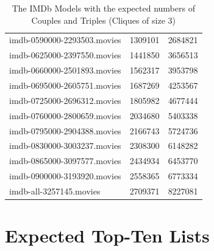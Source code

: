 \documentclass[a4paper,11pt]{article}
\begin{document}
\begin{table}[h!]
\begin{tabular}{| l | r | r |}
    imdb-0590000-2293503.movies & 1309101            & 2684821\\
    imdb-0625000-2397550.movies & 1441850            & 3656513\\
    imdb-0660000-2501893.movies & 1562317            & 3953798\\
    imdb-0695000-2605751.movies & 1687269            & 4253567\\
    imdb-0725000-2696312.movies & 1805982            & 4677444\\
    imdb-0760000-2800659.movies & 2034680            & 5403338\\
    imdb-0795000-2904388.movies & 2166743            & 5724736\\
    imdb-0830000-3003237.movies & 2308300            & 6148282\\
    imdb-0865000-3097577.movies & 2434934            & 6453770\\
    imdb-0900000-3193920.movies & 2558365            & 6773334\\
    imdb-all-3257145.movies     & 2709371            & 8227081\\
    \hline
  \end{tabular}
  \caption{The IMDb Models with the expected numbers of Couples and Triples (Cliques of size 3)}
  \label{tab:imdb-numbers}
\end{table}

\section{Expected Top-Ten Lists}
\label{sec:expected-top-ten}
\end{document}
